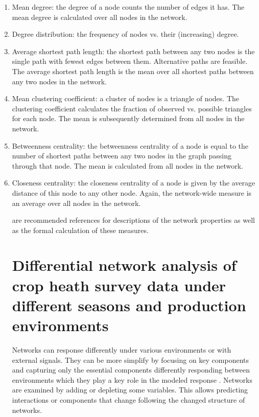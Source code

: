 \begin{enumerate}
\item Mean degree: the degree of a node counts the number of edges it has. The mean degree is calculated over all nodes in the network.
\item Degree distribution: the frequency of nodes vs. their (increasing) degree.
\item Average shortest path length: the shortest path between any two nodes is the single path with fewest edges between them. Alternative paths are feasible. The average shortest path length is the mean over all shortest paths between any two nodes in the network.
\item Mean clustering coefficient: a cluster of nodes is a triangle of nodes. The clustering coefficient calculates the fraction of observed vs. possible triangles for each node. The mean is subsequently determined from all nodes in the network.
\item Betweenness centrality: the betweenness centrality of a node is equal to the number of shortest paths between any two nodes in the graph passing through that node. The mean is calculated from all nodes in the network.
\item Closeness centrality: the closeness centrality of a node is given by the average distance of this node to any other node. Again, the network-wide measure is an average over all nodes in the network.

 are recommended references for descriptions of the network properties as well as the formal calculation of these measures.

\section*{Differential network analysis of crop heath survey data under different seasons and production environments}



Networks can response differently under various environments or with external signals. They can be more simplify by focusing on key components and capturing only the essential components differently responding between environments which they play a key role in the modeled response . Networks are examined by adding or depleting some variables. This allows predicting interactions or components that change following the changed structure of networks. 


\end{enumerate}
